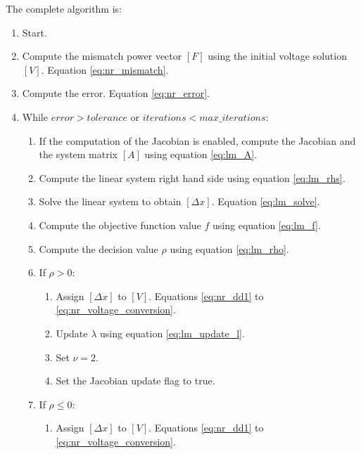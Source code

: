 \documentclass[nols,a4paper,twoside,notoc,fleqn]{tufte-book}
\begin{document}
The complete algorithm is: 

\begin{enumerate}

\item Start.

\item Compute the mismatch power vector $[F]$ using the initial voltage solution $[V]$. Equation \ref{eq:nr_mismatch}.

\item Compute the error. Equation \ref{eq:nr_error}.

\item While $error > tolerance$ or $iterations < max\_iterations$:

	\begin{enumerate}
	\item If the computation of the Jacobian is enabled, compute the Jacobian and the system matrix $[A]$ using equation \ref{eq:lm_A}.
	
	\item Compute the linear system right hand side using equation \ref{eq:lm_rhs}.
	
	\item Solve the linear system to obtain $[\Delta x]$. Equation \ref{eq:lm_solve}.
	
	\item Compute the objective function value $f$ using equation \ref{eq:lm_f}.
	
	\item Compute the decision value $\rho$ using equation \ref{eq:lm_rho}.
	
	\item If $\rho > 0$:
	
		\begin{enumerate}
		\item Assign $[\Delta x]$ to $[V]$. Equations \ref{eq:nr_dd1} to \ref{eq:nr_voltage_conversion}.
		
		\item Update $\lambda$ using equation \ref{eq:lm_update_l}.
		
		\item Set $\nu = 2$.
		
		\item Set the Jacobian update flag to true.
		\end{enumerate}
		
	\item If $\rho \leq 0$:
	
		\begin{enumerate}
		\item Assign $[\Delta x]$ to $[V]$. Equations \ref{eq:nr_dd1} to \ref{eq:nr_voltage_conversion}.
		

\end{enumerate}
\end{enumerate}
\end{enumerate}
\end{document}
